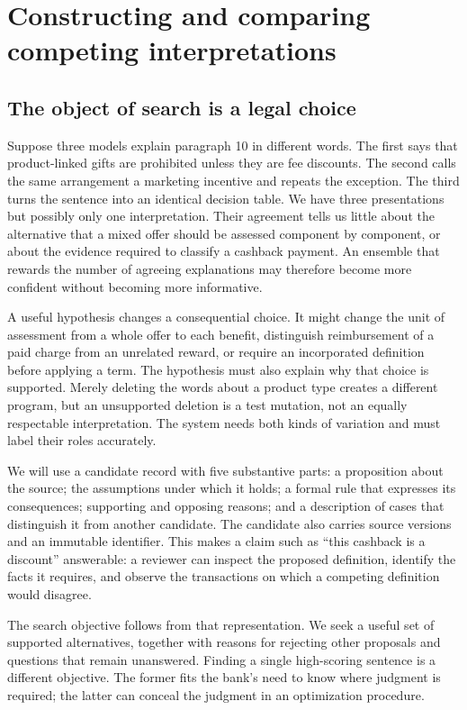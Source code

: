\chapter{Constructing and comparing competing interpretations}
\label{ch:search}

\section{The object of search is a legal choice}

Suppose three models explain paragraph 10 in different words. The first says that
product-linked gifts are prohibited unless they are fee discounts. The second
calls the same arrangement a marketing incentive and repeats the exception. The
third turns the sentence into an identical decision table. We have three
presentations but possibly only one interpretation. Their agreement tells us
little about the alternative that a mixed offer should be assessed component by
component, or about the evidence required to classify a cashback payment. An
ensemble that rewards the number of agreeing explanations may therefore become
more confident without becoming more informative.

A useful hypothesis changes a consequential choice. It might change the unit of
assessment from a whole offer to each benefit, distinguish reimbursement of a
paid charge from an unrelated reward, or require an incorporated definition
before applying a term. The hypothesis must also explain why that choice is
supported. Merely deleting the words about a product type creates a different
program, but an unsupported deletion is a test mutation, not an equally
respectable interpretation. The system needs both kinds of variation and must
label their roles accurately.

We will use a candidate record with five substantive parts: a proposition about
the source; the assumptions under which it holds; a formal rule that expresses
its consequences; supporting and opposing reasons; and a description of cases
that distinguish it from another candidate. The candidate also carries source
versions and an immutable identifier. This makes a claim such as ``this cashback
is a discount'' answerable: a reviewer can inspect the proposed definition,
identify the facts it requires, and observe the transactions on which a competing
definition would disagree.

The search objective follows from that representation. We seek a useful set of
supported alternatives, together with reasons for rejecting other proposals and
questions that remain unanswered. Finding a single high-scoring sentence is a
different objective. The former fits the bank's need to know where judgment is
required; the latter can conceal the judgment in an optimization procedure.

